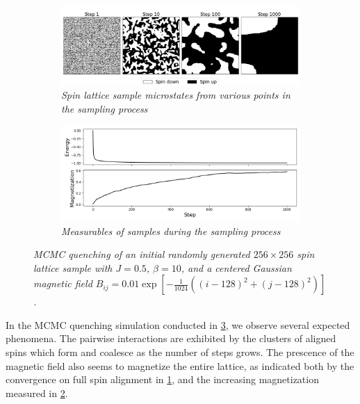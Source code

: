 \documentclass{article}
\begin{document}
\begin{figure}[h]
    \begin{subfigure}{\textwidth}
        \includegraphics[width=\textwidth]{report_mcmc_gaussian}
        \centering
        \caption{\textit{
            Spin lattice sample microstates from various points in the sampling 
            process
        }}
        \label{fig:mcmc_gaussian_a}
    \end{subfigure}
    \begin{subfigure}{\textwidth}
        \includegraphics[width=\textwidth]{report_mcmc_gaussian_measurables}
        \centering
        \caption{\textit{Measurables of samples during the sampling process}}
        \label{fig:mcmc_gaussian_b}
    \end{subfigure}
    \centering
    \caption{\textit{
        MCMC quenching of an initial randomly generated $256 \times 256$ spin 
        lattice sample with $J = 0.5$, $\beta = 10$, and a centered Gaussian 
        magnetic field
        $B_{ij} = 0.01 \exp [-\frac{1}{1024}((i-128)^2 + (j-128)^2)]$. 
    }}
    \label{fig:mcmc_gaussian}
\end{figure}

In the MCMC quenching simulation conducted in \ref{fig:mcmc_gaussian}, we 
observe several expected phenomena. 
The pairwise interactions are exhibited by the clusters of aligned spins which 
form and coalesce as the number of steps grows. 
The prescence of the magnetic field also seems to magnetize the entire lattice, 
as indicated both by the convergence on full spin alignment in 
\ref{fig:mcmc_gaussian_a}, and the increasing magnetization measured in 
\ref{fig:mcmc_gaussian_b}. 
\end{document}
